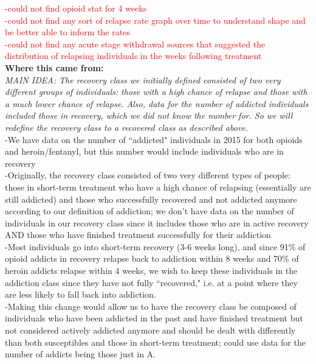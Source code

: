 \documentclass[12pt]{article}
\begin{document}
\textcolor{red}{-could not find opioid stat for 4 weeks \\
-could not find any sort of relapse rate graph over time to understand shape and be better able to inform the rates \\
-could not find any acute stage withdrawal sources that suggested the distribution of relapsing individuals in the weeks following treatment}  \\


\textbf{Where this came from:} \\

\textit{MAIN IDEA: The recovery class we initially defined consisted of two very different groups of individuals: those with a high chance of relapse and those with a much lower chance of relapse. Also, data for the number of addicted individuals included those in recovery, which we did not know the number for. So we will redefine the recovery class to a recovered class as described above.} \\

-We have data on the number of ``addicted" individuals in 2015 for both opioids and heroin/fentanyl, but  this number would include individuals who are in recovery \\
-Originally, the recovery class consisted of two very different types of people: those in short-term treatment who have a high chance of relapsing (essentially are still addicted) and those who successfully recovered and not addicted anymore according to our definition of addiction; we don't have data on the number of individuals in our recovery class since it includes those who are in active recovery AND those who have finished treatment successfully for their addiction \\
-Most individuals go into short-term recovery (3-6 weeks long), and since 91\% of opioid addicts in recovery relapse back to addiction within 8 weeks and 70\% of heroin addicts relapse within 4 weeks, we wish to keep these individuals in the addiction class since they have not fully ``recovered," i.e. at a point where they are less likely to fall back into addiction. \cite{NIH4, SAMSHA4, Weiss, Smyth}\\
-Making this change would allow us to have the recovery class be composed of individuals who have been addicted in the past and have finished treatment but not considered actively addicted anymore and should be dealt with differently than both susceptibles and those in short-term treatment; could use data for the number of addicts being those just in A. \\ 
\end{document}
